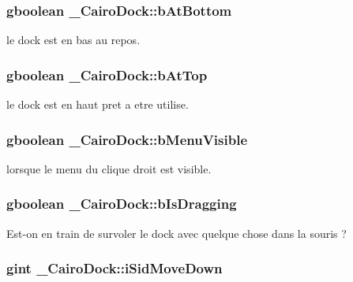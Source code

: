 \subsubsection{\setlength{\rightskip}{0pt plus 5cm}gboolean {\bf \_\-CairoDock::bAtBottom}}\label{struct__CairoDock_086f848a4a78d10afb853e7f85441c5f}


le dock est en bas au repos. 

\subsubsection{\setlength{\rightskip}{0pt plus 5cm}gboolean {\bf \_\-CairoDock::bAtTop}}\label{struct__CairoDock_2451c4ec51ea3b0a422b0897c7524c99}


le dock est en haut pret a etre utilise. 

\subsubsection{\setlength{\rightskip}{0pt plus 5cm}gboolean {\bf \_\-CairoDock::bMenuVisible}}\label{struct__CairoDock_5c0b8267beb8afd377f56d134df50a26}


lorsque le menu du clique droit est visible. 

\subsubsection{\setlength{\rightskip}{0pt plus 5cm}gboolean {\bf \_\-CairoDock::bIsDragging}}\label{struct__CairoDock_abc3a64a8ea7b8c84b0b03d16a225b27}


Est-on en train de survoler le dock avec quelque chose dans la souris ? 

\subsubsection{\setlength{\rightskip}{0pt plus 5cm}gint {\bf \_\-CairoDock::iSidMoveDown}}\label{struct__CairoDock_b873dfdfa1a1b7503d6f6a9cd720f5c8}


